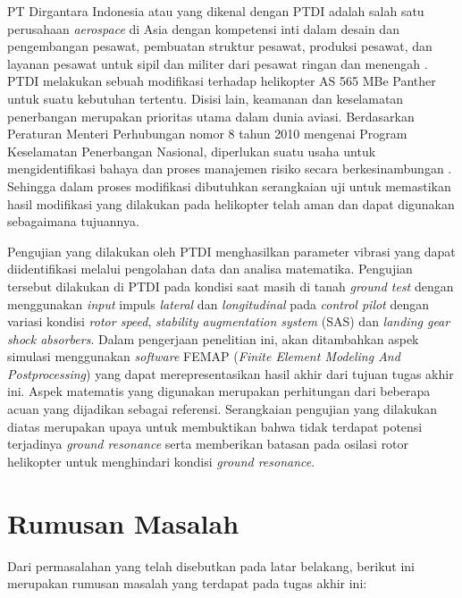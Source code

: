 PT Dirgantara Indonesia atau yang dikenal dengan PTDI adalah salah satu perusahaan \textit{aerospace} di Asia dengan kompetensi inti dalam desain dan pengembangan pesawat, pembuatan struktur pesawat, produksi pesawat, dan layanan pesawat untuk sipil dan militer dari pesawat ringan dan menengah \cite{PTDI}. PTDI melakukan sebuah modifikasi terhadap helikopter AS 565 MBe Panther untuk suatu kebutuhan tertentu. Disisi lain, keamanan dan keselamatan penerbangan merupakan prioritas utama dalam dunia aviasi. Berdasarkan Peraturan Menteri Perhubungan nomor 8 tahun 2010 mengenai Program Keselamatan Penerbangan Nasional, diperlukan suatu usaha untuk mengidentifikasi bahaya dan proses manajemen risiko secara berkesinambungan \cite{MenPerhub}. Sehingga dalam proses modifikasi dibutuhkan serangkaian uji untuk memastikan hasil modifikasi yang dilakukan pada helikopter telah aman dan dapat digunakan sebagaimana tujuannya.

Pengujian yang dilakukan oleh PTDI menghasilkan parameter vibrasi yang dapat diidentifikasi melalui pengolahan data dan analisa matematika. Pengujian tersebut dilakukan di PTDI pada kondisi saat masih di tanah \textit{ground test} dengan menggunakan \textit{input} impuls \textit{lateral} dan \textit{longitudinal} pada \textit{control pilot} dengan variasi kondisi \textit{rotor speed}, \textit{stability augmentation system} (SAS) dan \textit{landing gear shock absorbers}. Dalam pengerjaan penelitian ini, akan ditambahkan aspek simulasi menggunakan \textit{software} FEMAP (\textit{Finite Element Modeling And Postprocessing}) yang dapat merepresentasikan hasil akhir dari tujuan tugas akhir ini. Aspek matematis yang digunakan merupakan perhitungan dari beberapa acuan yang dijadikan sebagai referensi. Serangkaian pengujian yang dilakukan diatas merupakan upaya untuk membuktikan bahwa tidak terdapat potensi terjadinya \textit{ground resonance} serta memberikan batasan pada osilasi rotor helikopter untuk menghindari kondisi \textit{ground resonance}.

\section{Rumusan Masalah}
\label{sec:rumusan masalah}

Dari permasalahan yang telah disebutkan pada latar belakang, berikut ini merupakan rumusan masalah yang terdapat pada tugas akhir ini:

